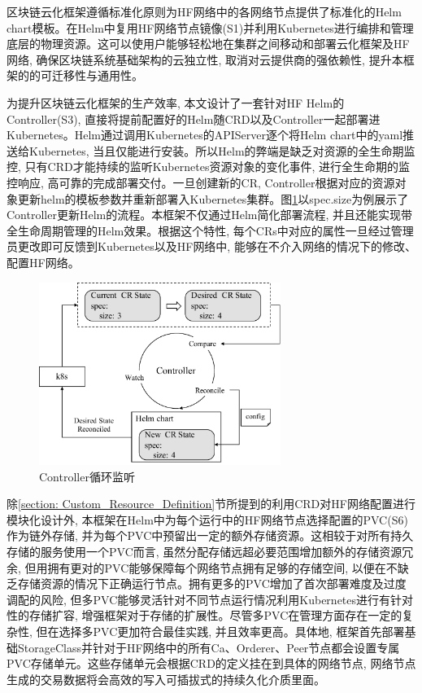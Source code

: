 区块链云化框架遵循标准化原则为HF网络中的各网络节点提供了标准化的Helm chart模板。在Helm中复用HF网络节点镜像(S1)并利用Kubernetes进行编排和管理底层的物理资源。这可以使用户能够轻松地在集群之间移动和部署云化框架及HF网络, 确保区块链系统基础架构的云独立性, 取消对云提供商的强依赖性, 提升本框架的的可迁移性与通用性。

为提升区块链云化框架的生产效率, 本文设计了一套针对HF Helm的Controller(S3), 直接将提前配置好的Helm随CRD以及Controller一起部署进Kubernetes。Helm通过调用Kubernetes的APIServer逐个将Helm chart中的yaml推送给Kubernetes, 当且仅能进行安装。所以Helm的弊端是缺乏对资源的全生命期监控, 只有CRD才能持续的监听Kubernetes资源对象的变化事件, 进行全生命期的监控响应, 高可靠的完成部署交付。一旦创建新的CR, Controller根据对应的资源对象更新helm的模板参数并重新部署入Kubernetes集群。图\ref{controller}以spec.size为例展示了Controller更新Helm的流程。本框架不仅通过Helm简化部署流程, 并且还能实现带全生命周期管理的Helm效果。根据这个特性, 每个CRs中对应的属性一旦经过管理员更改即可反馈到Kubernetes以及HF网络中, 能够在不介入网络的情况下的修改、配置HF网络。

\begin{figure}[h] %
    \centering %
    \includegraphics[width=0.7\textwidth]{FIGs/chapter4/controller.pdf} %
    \caption{Controller循环监听} %
    \label{controller} %
\end{figure}%


除\ref{section: Custom_Resource_Definition}节所提到的利用CRD对HF网络配置进行模块化设计外, 本框架在Helm中为每个运行中的HF网络节点选择配置的PVC(S6)作为链外存储, 并为每个PVC中预留出一定的额外存储资源。这相较于对所有持久存储的服务使用一个PVC而言, 虽然分配存储远超必要范围增加额外的存储资源冗余, 但用拥有更对的PVC能够保障每个网络节点拥有足够的存储空间, 以便在不缺乏存储资源的情况下正确运行节点。拥有更多的PVC增加了首次部署难度及过度调配的风险, 但多PVC能够灵活针对不同节点运行情况利用Kubernetes进行有针对性的存储扩容, 增强框架对于存储的扩展性。尽管多PVC在管理方面存在一定的复杂性, 但在选择多PVC更加符合最佳实践, 并且效率更高\cite{d2020design}。具体地, 框架首先部署基础StorageClass并针对于HF网络中的所有Ca、Orderer、Peer节点都会设置专属PVC存储单元。这些存储单元会根据CRD的定义挂在到具体的网络节点, 网络节点生成的交易数据将会高效的写入可插拔式的持续久化介质里面。

